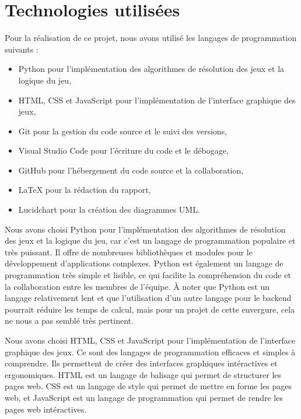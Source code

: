 \section{Technologies utilisées}

Pour la réalisation de ce projet, nous avons utilisé les langages de programmation suivants :
\begin{itemize}
	\item Python pour l'implémentation des algorithmes de résolution des jeux et la logique du jeu,
	\item HTML, CSS et JavaScript pour l'implémentation de l'interface graphique des jeux,
	\item Git pour la gestion du code source et le suivi des versions,
	\item Visual Studio Code pour l'écriture du code et le débogage,
	\item GitHub pour l'hébergement du code source et la collaboration,
	\item LaTeX pour la rédaction du rapport,
	\item Lucidchart pour la création des diagrammes UML.
\end{itemize}

Nous avons choisi Python pour l'implémentation des algorithmes de résolution des 
jeux et la logique du jeu, car c'est un langage de programmation populaire et 
très puissant. Il offre de nombreuses bibliothèques et modules pour le 
développement d'applications complexes. 
Python est également un langage de programmation très simple et lisible, 
ce qui facilite la compréhension du code et la collaboration entre les membres de 
l'équipe.
À noter que Python est un langage relativement lent et que l'utilisation d'un autre
langage pour le backend pourrait réduire les temps de calcul, mais pour un projet de cette envergure,
cela ne nous a pas semblé très pertinent.

Nous avons choisi HTML, CSS et JavaScript pour l'implémentation de l'interface
graphique des jeux. Ce sont des langages de programmation efficaces et 
simples à comprendre. Ils permettent de créer des interfaces graphiques intéractives 
et ergonomiques. HTML est un langage de balisage qui permet de structurer les pages
web. CSS est un langage de style qui permet de mettre en forme les pages web, et
JavaScript est un langage de programmation qui permet de rendre les pages web
intéractives.

